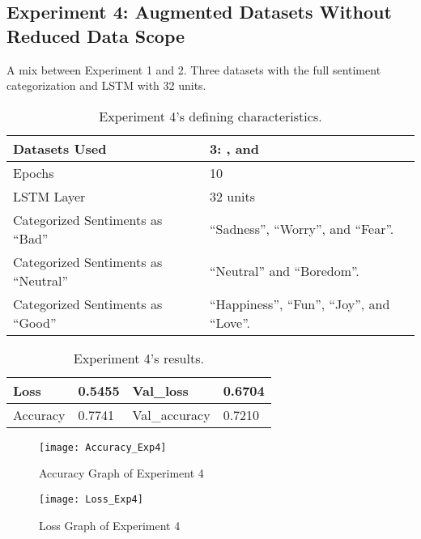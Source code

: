 \subsection{Experiment 4: Augmented Datasets Without Reduced Data Scope}
\label{exp4}
A mix between Experiment 1 and 2. Three datasets with the full sentiment categorization and LSTM with 32 units.
\begin{table}[!h]
	\caption{Experiment 4's defining characteristics.}
	\vspace{0.5cm}
	\centering
	\begin{tabular}[t]{|l|l|}
	\hline
		Datasets Used & \makecell{3: \citet{d1}, \citet{d2} and\\ \citet{d3}}
	\\ \hline
		Epochs & 10
	\\ \hline
		LSTM Layer & 32 units
	\\ \hline
		Categorized Sentiments as ``Bad'' & ``Sadness'', ``Worry'', and ``Fear''.
	\\ \hline	
		 Categorized Sentiments as ``Neutral'' & ``Neutral'' and ``Boredom''.
	\\ \hline	
		Categorized Sentiments as ``Good'' & ``Happiness'', ``Fun'', ``Joy'', and ``Love''.
	\\ \hline
	\end{tabular}
\end{table}

\begin{table}[!b]
	\caption{Experiment 4's results.}
	\vspace{0.5cm}
	\centering
	\begin{tabular}[t]{|l|l|l|l|}
	\hline
		Loss & 0.5455 & Val\_loss & 0.6704
	\\ \hline
		Accuracy & 0.7741 & Val\_accuracy & 0.7210
	\\ \hline
	\end{tabular}
\end{table}


\begin{figure}[!h]
	\centering
	\texttt{[image: Accuracy\_Exp4]}
	\caption{Accuracy Graph of Experiment 4}
	\label{fig:accuracy_exp4}
	\texttt{[image: Loss\_Exp4]}
	\caption{Loss Graph of Experiment 4}
	\label{fig:loss_exp4}
\end{figure}
\pagebreak


